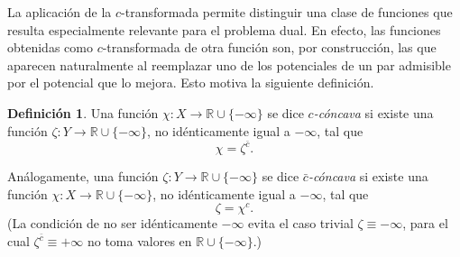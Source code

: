 \documentclass[12pt, a4paper]{amsbook}
\newcommand{\R}{{\mathbb R}}
\theoremstyle{remark}
\theoremstyle{definition}
\newtheorem{defi}[teo]{Definición}
\numberwithin{section}{chapter}
\numberwithin{subsection}{section}
\numberwithin{equation}{section}
\numberwithin{figure}{chapter}
\begin{document}
La aplicación de la $c$-transformada permite distinguir una clase de
funciones que resulta especialmente relevante para el problema dual. En
efecto, las funciones obtenidas como $c$-transformada de otra función son,
por construcción, las que aparecen naturalmente al reemplazar uno de los
potenciales de un par admisible por el potencial que lo mejora. Esto motiva
la siguiente definición.

\begin{defi}\label{def.cconcava}
Una función $\chi\colon X\to\R\cup\{-\infty\}$ se dice
\emph{$c$-cóncava} si existe una función
$\zeta\colon Y\to\R\cup\{-\infty\}$, no idénticamente igual a $-\infty$, tal que
\[
\chi=\zeta^{\bar c}.
\]

Análogamente, una función $\zeta\colon Y\to\R\cup\{-\infty\}$ se dice
\emph{$\bar c$-cóncava} si existe una función
$\chi\colon X\to\R\cup\{-\infty\}$, no idénticamente igual a $-\infty$, tal que
\[
\zeta=\chi^c.
\]
(La condición de no ser idénticamente $-\infty$ evita el caso trivial
$\zeta\equiv-\infty$, para el cual $\zeta^{\bar c}\equiv+\infty$ no toma
valores en $\R\cup\{-\infty\}$.)
\end{defi}
\end{document}
